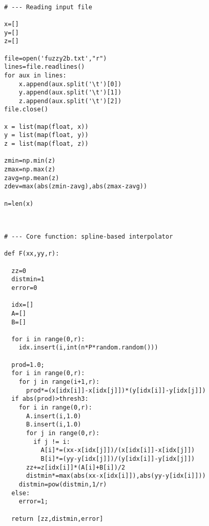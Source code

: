 \documentclass[oneside,10pt]{book}
\begin{document}
\quad \\

\begin{lstlisting}
# --- Reading input file

x=[]
y=[]
z=[]

file=open('fuzzy2b.txt',"r")
lines=file.readlines()
for aux in lines:
    x.append(aux.split('\t')[0])
    y.append(aux.split('\t')[1])
    z.append(aux.split('\t')[2])
file.close()

x = list(map(float, x))
y = list(map(float, y))
z = list(map(float, z))

zmin=np.min(z)
zmax=np.max(z)
zavg=np.mean(z)
zdev=max(abs(zmin-zavg),abs(zmax-zavg))

n=len(x)

\end{lstlisting}

\quad \\

\begin{lstlisting}
# --- Core function: spline-based interpolator

def F(xx,yy,r):

  zz=0
  distmin=1
  error=0

  idx=[]
  A=[]
  B=[]

  for i in range(0,r):
    idx.insert(i,int(n*P*random.random()))

  prod=1.0;
  for i in range(0,r):
    for j in range(i+1,r):
      prod*=(x[idx[i]]-x[idx[j]])*(y[idx[i]]-y[idx[j]])
  if abs(prod)>thresh3:
    for i in range(0,r):
      A.insert(i,1.0)
      B.insert(i,1.0)
      for j in range(0,r):
        if j != i:
          A[i]*=(xx-x[idx[j]])/(x[idx[i]]-x[idx[j]])
          B[i]*=(yy-y[idx[j]])/(y[idx[i]]-y[idx[j]])
      zz+=z[idx[i]]*(A[i]+B[i])/2
      distmin*=max(abs(xx-x[idx[i]]),abs(yy-y[idx[i]]))
    distmin=pow(distmin,1/r)
  else:
    error=1;

  return [zz,distmin,error]
\end{lstlisting}

\quad \\
\end{document}
